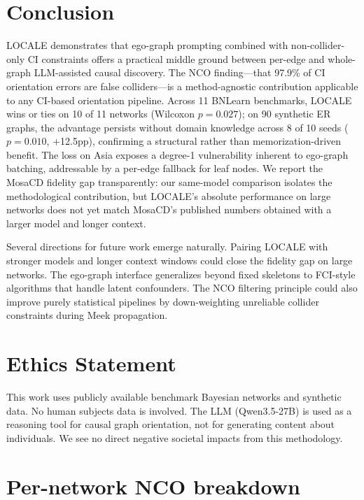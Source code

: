 \documentclass{article} %
\begin{document}
\section{Conclusion}

LOCALE demonstrates that ego-graph prompting combined with non-collider-only CI constraints offers a practical middle ground between per-edge and whole-graph LLM-assisted causal discovery. The NCO finding---that 97.9\% of CI orientation errors are false colliders---is a method-agnostic contribution applicable to any CI-based orientation pipeline. Across 11 BNLearn benchmarks, LOCALE wins or ties on 10 of 11 networks (Wilcoxon $p{=}0.027$); on 90 synthetic ER graphs, the advantage persists without domain knowledge across 8 of 10 seeds ($p{=}0.010$, $+$12.5pp), confirming a structural rather than memorization-driven benefit. The loss on Asia exposes a degree-1 vulnerability inherent to ego-graph batching, addressable by a per-edge fallback for leaf nodes. We report the MosaCD fidelity gap transparently: our same-model comparison isolates the methodological contribution, but LOCALE's absolute performance on large networks does not yet match MosaCD's published numbers obtained with a larger model and longer context.

Several directions for future work emerge naturally. Pairing LOCALE with stronger models and longer context windows could close the fidelity gap on large networks. The ego-graph interface generalizes beyond fixed skeletons to FCI-style algorithms that handle latent confounders. The NCO filtering principle could also improve purely statistical pipelines by down-weighting unreliable collider constraints during Meek propagation.

\section*{Ethics Statement}
This work uses publicly available benchmark Bayesian networks and synthetic data. No human subjects data is involved. The LLM (Qwen3.5-27B) is used as a reasoning tool for causal graph orientation, not for generating content about individuals. We see no direct negative societal impacts from this methodology.





\appendix
\section{Per-network NCO breakdown}
\label{app:nco-per-network}
\end{document}
